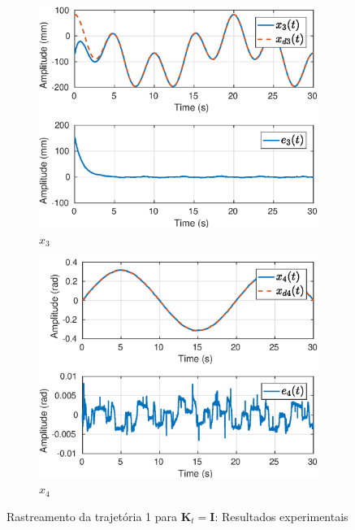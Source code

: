 \begin{figure}[H]
\begin{subfigure}{.5\textwidth}
  \includegraphics[width=\linewidth]{./img/traj_1_k1/x3.eps}
  \caption{$x_3$}
  \label{fig:sub1}
\end{subfigure}%
\begin{subfigure}{.5\textwidth}
  \centering
  \includegraphics[width=\linewidth]{./img/traj_1_k1/x4.eps}
  \caption{$x_4$}
  \label{fig:sub2}
\end{subfigure}
\caption{Rastreamento da trajetória 1 para $\bm{K}_t = \bm{I}$: Resultados experimentais}
\label{fig:test}
\end{figure}

